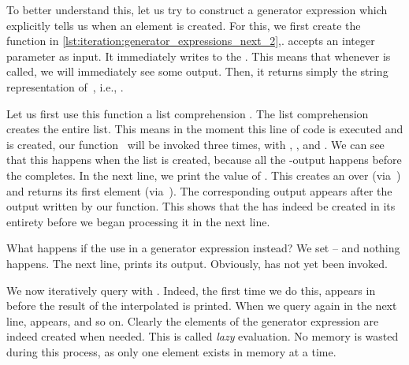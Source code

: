 To better understand this, let us try to construct a generator expression which explicitly tells us when an element is created.
For this, we first create the function  in \cref{lst:iteration:generator_expressions_next_2},.
 accepts an integer parameter  as input.
It immediately writes  to the .
This means that whenever  is called, we will immediately see some output.
Then, it returns simply the string representation of~, i.e., .

Let us first use this function a list comprehension .
The list comprehension creates the entire list.
This means in the moment this line of code is executed and  is created, our function~ will be invoked three times, with , , and .
We can see that this happens when the list is created, because all the -output happens before the  completes.
In the next line, we print the value of .
This creates an  over  (via~) and returns its first element (via~).
The corresponding output appears after the output written by our  function.
This shows that the  has indeed be created in its entirety before we began processing it in the next line.%
%
\begin{sloppypar}%
What happens if the use  in a generator expression instead?
We set  -- and nothing happens.
The next line,  prints its output.
Obviously,  has not yet been invoked.%
\end{sloppypar}%
%
We now iteratively query  with .
Indeed, the first time we do this,  appears in  before the result of the interpolated   is printed.
When we query  again in the next line,  appears, and so on.
Clearly the elements of the generator expression are indeed created when needed.
This is called \emph{lazy} evaluation.
No memory is wasted during this process, as only one element exists in memory at a time.

